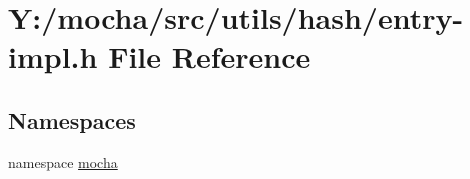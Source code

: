 \hypertarget{entry-impl_8h}{
\section{Y:/mocha/src/utils/hash/entry-\/impl.h File Reference}
\label{entry-impl_8h}
}
\subsection*{Namespaces}
\begin{DoxyCompactItemize}
\item 
namespace \hyperlink{namespacemocha}{mocha}
\end{DoxyCompactItemize}
